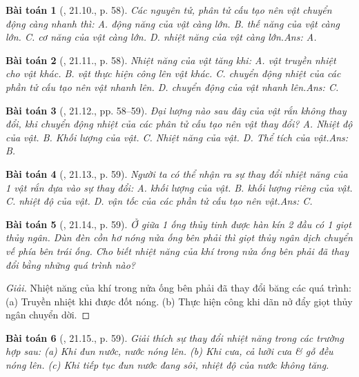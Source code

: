 \documentclass{article}
\newtheorem{baitoan}{Bài toán}
\begin{document}
\begin{baitoan}[\cite{SBT_Vat_Ly_8}, 21.10., p. 58]
	Các nguyên tử, phân tử cấu tạo nên vật chuyển động càng nhanh thì: {\sf A.} động năng của vật càng lớn. {\sf B.} thế năng của vật càng lớn. {\sf C.} cơ năng của vật càng lớn. {\sf D.} nhiệt năng của vật càng lớn.\hfill{\sf Ans: A.}
\end{baitoan}

\begin{baitoan}[\cite{SBT_Vat_Ly_8}, 21.11., p. 58]
	Nhiệt năng của vật tăng khi: {\sf A.} vật truyền nhiệt cho vật khác. {\sf B.} vật thực hiện công lên vật khác. {\sf C.} chuyển động nhiệt của các phần tử cấu tạo nên vật nhanh lên. {\sf D.} chuyển động của vật nhanh lên.\hfill{\sf Ans: C.}
\end{baitoan}

\begin{baitoan}[\cite{SBT_Vat_Ly_8}, 21.12., pp. 58--59]
	Đại lượng nào sau đây của vật rắn không thay đổi, khi chuyển động nhiệt của các phân tử cấu tạo nên vật thay đổi? {\sf A.} Nhiệt độ của vật. {\sf B.} Khối lượng của vật. {\sf C.} Nhiệt năng của vật. {\sf D.} Thể tích của vật.\hfill{\sf Ans: B.}
\end{baitoan}

\begin{baitoan}[\cite{SBT_Vat_Ly_8}, 21.13., p. 59]
	Người ta có thể nhận ra sự thay đổi nhiệt năng của 1 vật rắn dựa vào sự thay đổi: {\sf A.} khối lượng của vật. {\sf B.} khối lượng riêng của vật. {\sf C.} nhiệt độ của vật. {\sf D.} vận tốc của các phần tử cấu tạo nên vật.\hfill{\sf Ans: C.}
\end{baitoan}

\begin{baitoan}[\cite{SBT_Vat_Ly_8}, 21.14., p. 59]
	Ở giữa 1 ống thủy tinh được hàn kín 2 đầu có 1 giọt thủy ngân. Dùn đèn cồn hơ nóng nửa ống bên phải thì giọt thủy ngân dịch chuyển vế phía bên trái ống. Cho biết nhiệt năng của khí trong nửa ống bên phải đã thay đổi bằng những quá trình nào?
\end{baitoan}

\begin{proof}[Giải]
	Nhiệt năng của khí trong nửa ống bên phải đã thay đổi băng các quá trình: (a) Truyền nhiệt khi được đốt nóng. (b) Thực hiện công khi dãn nở đẩy giọt thủy ngân chuyển dời.
\end{proof}

\begin{baitoan}[\cite{SBT_Vat_Ly_8}, 21.15., p. 59]
	Giải thích sự thay đổi nhiệt năng trong các trường hợp sau: (a) Khi đun nước, nước nóng lên. (b) Khi cưa, cả lưỡi cưa \& gỗ đều nóng lên. (c) Khi tiếp tục đun nước đang sôi, nhiệt độ của nước không tăng.
\end{baitoan}
\end{document}
